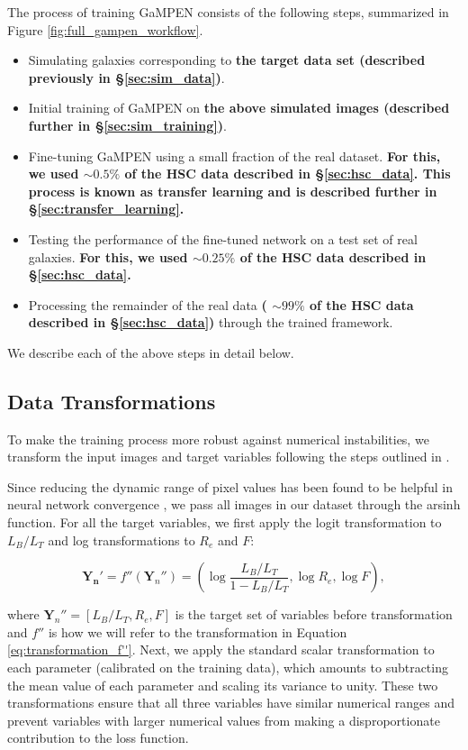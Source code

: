\documentclass[linenumbers,twocolumn,twocolappendix]{aastex631}
\newcommand\gampen{GaMPEN}
\begin{document}
\begin{CJK*}{UTF8}{gbsn}
The process of training \gampen{} consists of the following steps, summarized in Figure \ref{fig:full_gampen_workflow}.
\begin{itemize}
\item Simulating galaxies corresponding to \textbf{the target data set (described previously in \S \ref{sec:sim_data})}.
\item Initial training of \gampen{} on \textbf{the above simulated images (described further in \S \ref{sec:sim_training})}.
\item Fine-tuning \gampen{} using a small fraction of the real dataset. \textbf{For this, we used $\sim0.5\%$ of the HSC data described in \S \ref{sec:hsc_data}. This process is known as transfer learning and is described further in \S \ref{sec:transfer_learning}.}
\item Testing the performance of the fine-tuned network on a test set of real galaxies. \textbf{For this, we used $\sim0.25\%$ of the HSC data described in \S \ref{sec:hsc_data}.}
\item Processing the remainder of the real data \textbf{( $\sim99\%$ of the HSC data described in \S \ref{sec:hsc_data})} through the trained framework.
\end{itemize}

We describe each of the above steps in detail below. 

\subsection{Data Transformations} \label{sec:transformations}

To make the training process more robust against numerical instabilities, we transform the input images and target variables following the steps outlined in \citet{gampen_software_paper}.

Since reducing the dynamic range of pixel values has been found to be helpful in neural network convergence \citep[e.g.,][]{zanisi_21,walmsley_decals,tanaka_22}, we pass all images in our dataset through the arsinh function. For all the target variables, we first apply the logit transformation to $L_B/L_T$ and log transformations to $R_e$ and $F$: 

\begin{equation}
\boldsymbol{Y_n'} = f''(\boldsymbol{Y}_n'') = \left( \log \frac{L_B/L_T}{1 - L_B/L_T}, \log R_e, \log F \right) ,
\label{eq:transformation_f''}
\end{equation} 

\noindent
where $\boldsymbol{Y}_n'' = [{L_B/L_T,R_e,F}]$ is the target set of variables before transformation and $f''$ is how we will refer to the transformation in Equation\,\ref{eq:transformation_f''}. Next, we apply the standard scalar transformation to each parameter (calibrated on the training data), which amounts to subtracting the mean value of each parameter and scaling its variance to unity. These two transformations ensure that all three variables have similar numerical ranges and prevent variables with larger numerical values from making a disproportionate contribution to the loss function.


\end{CJK*}
\end{document}
